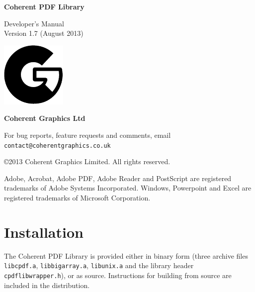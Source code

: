 \documentclass[a4paper]{memoir}
\newcommand{\smallgap}{\vspace{4mm}}
\begin{document}
\frontmatter
\thispagestyle{empty}

\begin{flushright}

{\sffamily \bfseries \Huge Coherent PDF Library}

\vspace{12mm}

{\Huge Developer's Manual}\\\vspace{2mm}
Version 1.7 (August 2013)

\vspace{25mm}

\vfill

\includegraphics{logo.pdf}

\vspace{2mm}
{\sffamily \bfseries \LARGE Coherent Graphics Ltd}

\end{flushright}

\clearpage

\thispagestyle{empty}
\noindent For bug reports, feature requests and comments, email\\ \texttt{contact@coherentgraphics.co.uk}

\vspace*{\fill}
\noindent\copyright 2013 Coherent Graphics Limited. All rights reserved.

\smallgap 
\noindent Adobe, Acrobat, Adobe PDF, Adobe Reader and PostScript are
registered trademarks of Adobe Systems Incorporated. Windows, Powerpoint and
Excel are registered trademarks of Microsoft Corporation.

\cleardoublepage
\tableofcontents

\cleardoublepage
\mainmatter
{}
\pagestyle{ruled}
\chapter{Installation}
The Coherent PDF Library is provided either in binary form (three archive files \texttt{libcpdf.a}, \texttt{libbigarray.a}, \texttt{libunix.a} and the library header \texttt{cpdflibwrapper.h}), or as source. Instructions for building from source are included in the distribution.
\end{document}
